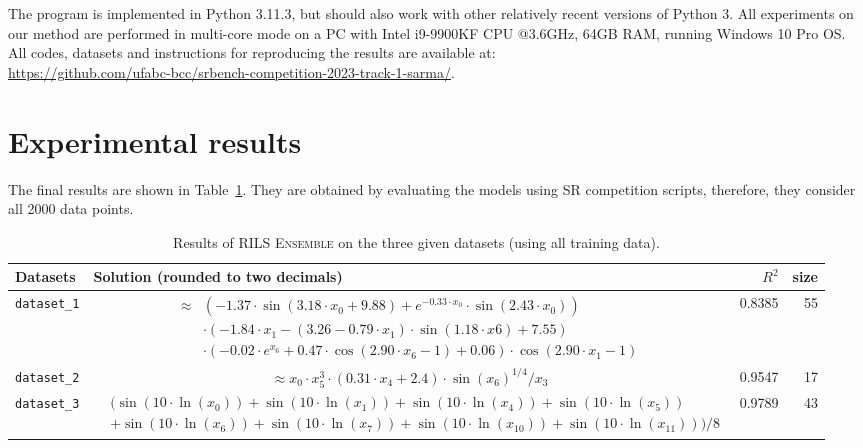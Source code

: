 \documentclass{article}
\begin{document}
The program is implemented in Python 3.11.3, but should also work with other relatively recent versions of Python 3. All experiments on our method are performed in multi-core mode on a PC with Intel i9-9900KF CPU @3.6GHz, 64GB RAM, running Windows 10 Pro OS. All codes, datasets and instructions for reproducing the results are available at: \\ \url{https://github.com/ufabc-bcc/srbench-competition-2023-track-1-sarma/}.

\section{Experimental results}

The final results are shown in Table~\ref{tab:results}. They are obtained by evaluating the models using SR competition scripts, therefore, they consider all 2000 data points.

\begin{table}[ht]
 \renewcommand*{\arraystretch}{1.4}
    \footnotesize
    \caption{Results of \textsc{RILS Ensemble} on the three given datasets (using all training data).}
    \centering
    \begin{tabular}{l |lrr} \hline
    Datasets & Solution (rounded to two decimals) & $R^2$   &  size  \\ \hline \hline
      \texttt{dataset\_1}  &
      \parbox{10cm}{
      \begin{equation}
      \nonumber
    \begin{aligned}
      \approx & (-1.37\cdot \sin(3.18\cdot x_0 + 9.88) + e^{-0.33\cdot x_0}\cdot \sin(2.43\cdot x_0)) 
      \\ &\cdot (-1.84\cdot x_1 - (3.26 - 0.79\cdot x_1)\cdot \sin(1.18\cdot x6) + 7.55)
      \\ & \cdot (-0.02\cdot e^{x_6} + 0.47\cdot \cos(2.90\cdot x_6 - 1) + 0.06)\cdot \cos(2.90\cdot x_1 - 1) 
      \end{aligned}
      \end{equation}
      }
      & 0.8385 & 55 \\ \hline
      \texttt{dataset\_2}  & 
      \parbox{10cm}{
      \begin{equation}
      \nonumber
      \approx x_0\cdot x_5^3\cdot(0.31\cdot x_4 + 2.4)\cdot \sin(x_6)^{1/4}/x_3
    \end{equation}
      } & 0.9547 & 17\\ \hline
      \texttt{dataset\_3}  & 
      \parbox{10cm}{
       \begin{equation}
      \nonumber
        \begin{aligned}
      & (\sin(10\cdot \ln(x_0))+ \sin(10\cdot \ln(x_1)) + \sin(10\cdot \ln(x_4)) + \sin(10\cdot \ln(x_5)) \\
      &+ \sin(10\cdot \ln(x_6)) +  \sin(10\cdot \ln(x_7)) + \sin(10\cdot \ln(x_{10})) + \sin(10\cdot \ln(x_{11})))/8
      \end{aligned}
      \end{equation}}
       & 0.9789 & 43\\ \hline
    \end{tabular}
    \label{tab:results}
\end{table}
\end{document}
